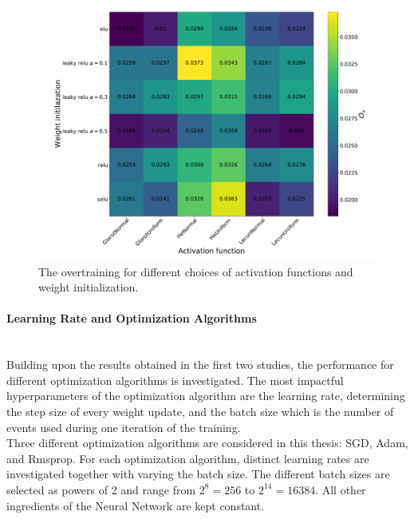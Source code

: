 \begin{figure}[H]
\centering
\includegraphics[width=\linewidth]{figs/FNN/Heat_Ovactiv}
\caption{The overtraining for different choices of activation functions and weight initialization.}
\label{fig:OvActiv}
\end{figure}

\newpage

\paragraph{Learning Rate and Optimization Algorithms}  \mbox{} \\

Building upon the results obtained in the first two studies, the performance for different optimization algorithms is investigated. The most impactful hyperparameters of the optimization algorithm are the learning rate, determining the step size of every weight update, and the batch size which is the number of events used during one iteration of the training. \\
Three different optimization algorithms are considered in this thesis: SGD, Adam, and Rmsprop. For each optimization algorithm, distinct learning rates are investigated together with varying the batch size. The different batch sizes are selected as powers of 2 and range from $2^8 = 256$ to $2^{14} = 16384$. All other ingredients of the Neural Network are kept constant. \\


